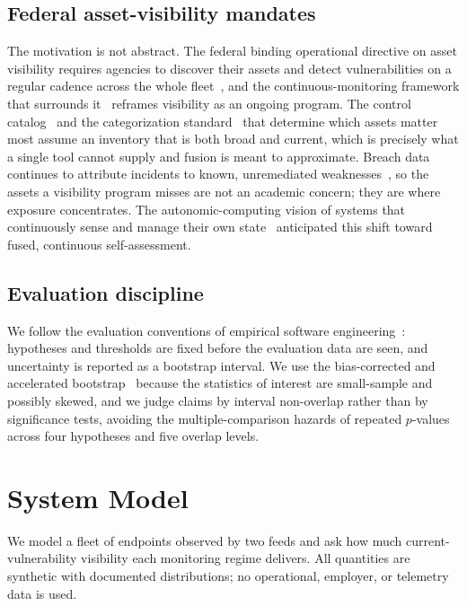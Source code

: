 \documentclass[journal]{IEEEtran}
\begin{document}
\subsection{Federal asset-visibility mandates}
The motivation is not abstract. The federal binding operational directive on asset visibility
requires agencies to discover their assets and detect vulnerabilities on a regular cadence across
the whole fleet~\cite{cisabod2301}, and the continuous-monitoring framework that surrounds
it~\cite{nist80137,nist80137a} reframes visibility as an ongoing program. The control
catalog~\cite{nist80053} and the categorization standard~\cite{fips199} that determine which assets
matter most assume an inventory that is both broad and current, which is precisely what a single
tool cannot supply and fusion is meant to approximate. Breach data continues to attribute incidents
to known, unremediated weaknesses~\cite{verizon2026dbir}, so the assets a visibility program misses
are not an academic concern; they are where exposure concentrates. The autonomic-computing vision of
systems that continuously sense and manage their own state~\cite{kephart2003vision} anticipated this
shift toward fused, continuous self-assessment.

\subsection{Evaluation discipline}
We follow the evaluation conventions of empirical software engineering~\cite{wohlin2012experimentation}:
hypotheses and thresholds are fixed before the evaluation data are seen, and uncertainty is reported
as a bootstrap interval. We use the bias-corrected and accelerated bootstrap~\cite{efron1987bca,efron1994introduction}
because the statistics of interest are small-sample and possibly skewed, and we judge claims by
interval non-overlap rather than by significance tests, avoiding the multiple-comparison hazards of
repeated $p$-values across four hypotheses and five overlap levels.

\section{System Model}
\label{sec:model}
We model a fleet of endpoints observed by two feeds and ask how much current-vulnerability
visibility each monitoring regime delivers. All quantities are synthetic with documented
distributions; no operational, employer, or telemetry data is used.
\end{document}
